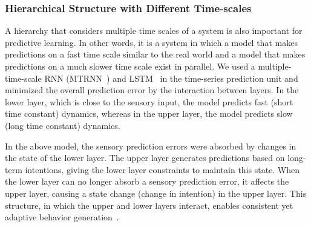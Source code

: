 \subsubsection{Hierarchical Structure with Different Time-scales}
\label{sec_timescale}

A hierarchy that considers multiple time scales of a system is also important for predictive learning. In other words, it is a system in which a model that makes predictions on a fast time scale similar to the real world and a model that makes predictions on a much slower time scale exist in parallel. We used a multiple-time-scale RNN (MTRNN~\cite{Yamashita2008emergence}) and LSTM~\cite{Hochreiter1997nc} in the time-series prediction unit and minimized the overall prediction error by the interaction between layers. In the lower layer, which is close to the sensory input, the model predicts fast (short time constant) dynamics, whereas in the upper layer, the model predicts slow (long time constant) dynamics.


In the above model, the sensory prediction errors were absorbed by changes in the state of the lower layer. The upper layer generates predictions based on long-term intentions, giving the lower layer constraints to maintain this state. When the lower layer can no longer absorb a sensory prediction error, it affects the upper layer, causing a state change (change in intention) in the upper layer. This structure, in which the upper and lower layers interact, enables consistent yet adaptive behavior generation~\cite{Suzuki2018ral,Saito2021}.


